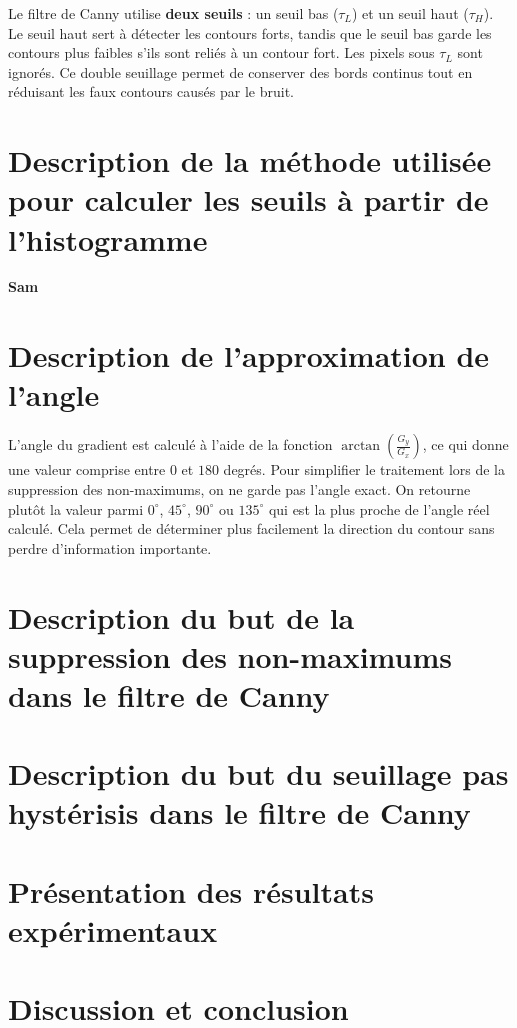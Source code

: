 \documentclass{article}
\begin{document}
Le filtre de Canny utilise \textbf{deux seuils} : un seuil bas (\(\tau_L\)) et un seuil haut (\(\tau_H\)).  
Le seuil haut sert à détecter les contours forts, tandis que le seuil bas garde les contours plus faibles s’ils sont reliés à un contour fort.  
Les pixels sous \(\tau_L\) sont ignorés.  
Ce double seuillage permet de conserver des bords continus tout en réduisant les faux contours causés par le bruit.

\section{Description de la méthode utilisée pour calculer les seuils à partir de l'histogramme}

\textbf{Sam }

\section{Description de l’approximation de l’angle}

L’angle du gradient est calculé à l’aide de la fonction \(\arctan\left(\frac{G_y}{G_x}\right)\), ce qui donne une valeur comprise entre \(0\) et \(180\) degrés.  
Pour simplifier le traitement lors de la suppression des non-maximums, on ne garde pas l’angle exact.  
On retourne plutôt la valeur parmi \(0^\circ\), \(45^\circ\), \(90^\circ\) ou \(135^\circ\) qui est la plus proche de l’angle réel calculé.  
Cela permet de déterminer plus facilement la direction du contour sans perdre d’information importante.

\section{Description du but de la suppression des non-maximums dans le filtre de Canny}
\section{Description du but du seuillage pas hystérisis dans le filtre de Canny}
\section{Présentation des résultats expérimentaux}
\section{Discussion et conclusion}
\end{document}

